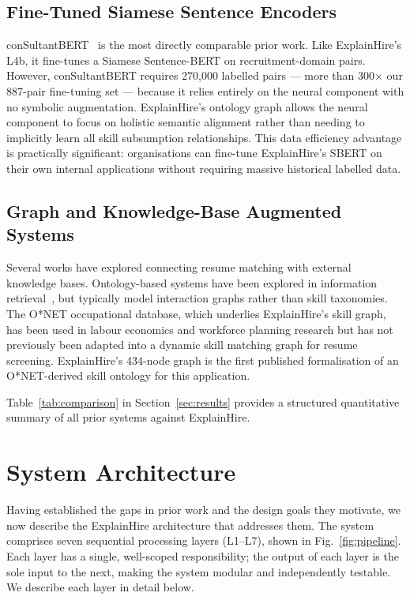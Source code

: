 \documentclass[conference]{IEEEtran}
\begin{document}
\subsection{Fine-Tuned Siamese Sentence Encoders}
conSultantBERT~\cite{lavi2021consultantbert} is the most directly comparable
prior work. Like ExplainHire's L4b, it fine-tunes a Siamese Sentence-BERT
on recruitment-domain pairs. However, conSultantBERT requires 270,000
labelled pairs --- more than 300$\times$ our 887-pair fine-tuning set ---
because it relies entirely on the neural component with no symbolic
augmentation. ExplainHire's ontology graph allows the neural component to
focus on holistic semantic alignment rather than needing to implicitly learn
all skill subsumption relationships. This data efficiency advantage is
practically significant: organisations can fine-tune ExplainHire's SBERT
on their own internal applications without requiring massive historical
labelled data.

\subsection{Graph and Knowledge-Base Augmented Systems}
Several works have explored connecting resume matching with external
knowledge bases. Ontology-based systems have been explored in information
retrieval~\cite{bian2020multiview}, but typically model interaction graphs
rather than skill taxonomies. The O*NET occupational database, which underlies
ExplainHire's skill graph, has been used in labour economics and workforce
planning research but has not previously been adapted into a dynamic skill
matching graph for resume screening. ExplainHire's 434-node graph is the
first published formalisation of an O*NET-derived skill ontology for this
application.

Table~\ref{tab:comparison} in Section~\ref{sec:results} provides a structured
quantitative summary of all prior systems against ExplainHire.

\section{System Architecture}
\label{sec:arch}

Having established the gaps in prior work and the design goals they motivate,
we now describe the ExplainHire architecture that addresses them.
The system comprises seven sequential processing layers (L1--L7), shown in
Fig.~\ref{fig:pipeline}. Each layer has a single, well-scoped
responsibility; the output of each layer is the sole input to the next,
making the system modular and independently testable. We describe each layer
in detail below.
\end{document}
